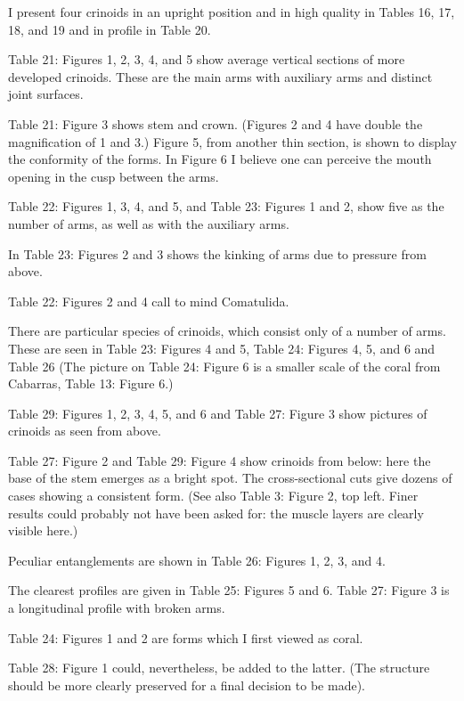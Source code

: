 \documentclass[a4paper, 12pt, oneside]{article}
\begin{document}
I present four crinoids in an upright position and in high quality in Tables 16, 17, 18, and 19 and in profile in Table 20.

Table 21: Figures 1, 2, 3, 4, and 5 show average vertical sections of more developed crinoids. These are the main arms with auxiliary arms and distinct joint surfaces.

Table 21: Figure 3 shows stem and crown. (Figures 2 and 4 have double the magnification of 1 and 3.) Figure 5, from another thin section, is shown to display the conformity of the forms. In Figure 6 I believe one can perceive the mouth opening in the cusp between the arms.

Table 22: Figures 1, 3, 4, and 5, and Table 23: Figures 1 and 2, show five as the number of arms, as well as with the auxiliary arms.

In Table 23: Figures 2 and 3 shows the kinking of arms due to pressure from above.

Table 22: Figures 2 and 4 call to mind Comatulida.

There are particular species of crinoids, which consist only of a number of arms. These are seen in Table 23: Figures 4 and 5, Table 24: Figures 4, 5, and 6 and Table 26 (The picture on Table 24: Figure 6 is a smaller scale of the coral from Cabarras, Table 13: Figure 6.)

Table 29: Figures 1, 2, 3, 4, 5, and 6 and Table 27: Figure 3 show pictures of crinoids as seen from above.

Table 27: Figure 2 and Table 29: Figure 4 show crinoids from below: here the base of the stem emerges as a bright spot. The cross-sectional cuts give dozens of cases showing a consistent form. (See also Table 3: Figure 2, top left. Finer results could probably not have been asked for: the muscle layers are clearly visible here.)

Peculiar entanglements are shown in Table 26: Figures 1, 2, 3, and 4.

The clearest profiles are given in Table 25: Figures 5 and 6. Table 27: Figure 3 is a longitudinal profile with broken arms.

Table 24: Figures 1 and 2 are forms which I first viewed as coral.

Table 28: Figure 1 could, nevertheless, be added to the latter. (The structure should be more clearly preserved for a final decision to be made).
\end{document}

